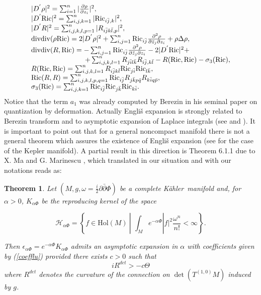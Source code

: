 \documentclass[11pt, reqno]{amsart}
\newtheorem{theor}{Theorem}
\begin{document}
\begin{equation}\begin{array}{l}\label{values}
|D^{'}\rho|^2=\sum_{i=1}^n|\frac{\partial \rho}{\partial z_i}|^2,\\
|D^{'}{\mathrm{Ric}}|^2=\sum_{i, j, k=1}^n|{\mathrm{Ric}}_{i\bar j,k}|^2,\\
|D^{'}R|^2=\sum_{i, j, k, l, p=1}^n|R_{i\bar jk\bar l,p}|^2,\\
{\mathop{\hbox{div}}}{\mathop{\hbox{div}}} (\rho {\mathrm{Ric}})=2|D^{'}\rho|^2+
\sum_{i,j=1}^n{\mathrm{Ric}}_{i\bar j}\frac{\partial^2 \rho}{\partial\bar z_j\partial z_i}
+\rho\Delta\rho,\\
{\mathop{\hbox{div}}}{\mathop{\hbox{div}}} (R, {\mathrm{Ric}})=
-\sum_{i,j=1}^n{\mathrm{Ric}}_{i\bar j}\frac{\partial^2 \rho}{\partial\bar z_j\partial z_i}
-2|D^{'}{\mathrm{Ric}}|^2+\\
\qquad\qquad\qquad\quad\ \ +\sum_{i, j, k, l=1}^nR_{j\bar il\bar k}R_{i\bar j,k\bar l}-
R({\mathrm{Ric}}, {\mathrm{Ric}})-\sigma_3({\mathrm{Ric}}),\\
R({\mathrm{Ric}}, {\mathrm{Ric}})=\sum_{i, j, k, l=1}^nR_{i\bar jk\bar l}{\mathrm{Ric}}_{j\bar i}{\mathrm{Ric}}_{l\bar k},\\
{\mathrm{Ric}}(R, R)=\sum_{i, j, k, l,p,q=1}^n{\mathrm{Ric}}_{i\bar j}R_{j\bar kp\bar q}R_{k\bar iq\bar p},\\
\sigma_3 ({\mathrm{Ric}})=\sum_{i, j, k=1}^n{\mathrm{Ric}}_{i\bar j}{\mathrm{Ric}}_{j\bar k}{\mathrm{Ric}}_{k\bar i}.\\
\end{array}\end{equation}
Notice that the term $a_1$ was already computed by Berezin in his
seminal paper \cite{Ber1} on quantization by deformation. Actually
Engli\v{s} expansion  is strongly related to Berezin
transform and to asymptotic expansion of Laplace integrals
(see \cite{englis2} and   \cite{loismooth}).
It is important to point out that for a general noncompact manifold
there is not a general theorem which assures the existence of Engli\v{s} expansion
(see \cite{graloi} for the case of the Kepler manifold). A partial result in this direction is
Theorem 6.1.1 due to X. Ma and G. Marinescu \cite{mama}, which translated in our situation and with our notations reads as:

\begin{theor}\label{marinescuma}
Let $(M, g, \omega =\frac{i}{2}{\partial}\bar{\partial}\Phi)$ be a complete {K\"{a}hler}\ manifold  and, for $\alpha>0$, $K_{\alpha\Phi}$ be the reproducing kernel of the space

\begin{equation}
{\mathcal{H}}_{\alpha \Phi}=\left\{ f\in{\mathrm{Hol}}(M) \ | \ \, \int_M e^{-\alpha \Phi}|f|^2 \frac{\omega^n}{n!} <\infty\right\}.
\end{equation}

\noindent Then $\epsilon_{\alpha\Phi}=e^{-\alpha\Phi}K_{\alpha\Phi}$ admits an asymptotic expansion in $\alpha$ with coefficients given by (\ref{coefflu}) provided there exists $c > 0$ such that
$$ i  R^{det} > - c \Theta$$
where $R^{det}$ denotes the curvature of the connection on $\det(T^{(1,0)} M)$ induced by $g$.
\end{theor}
\end{document}
